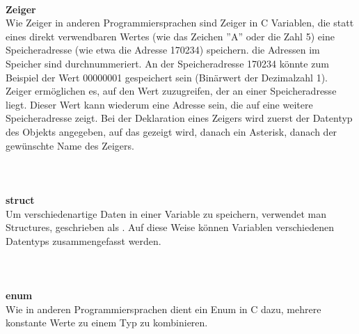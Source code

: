 \ \\
\textbf{Zeiger}\\
Wie Zeiger in anderen Programmiersprachen sind Zeiger in C Variablen, die statt eines direkt verwendbaren Wertes (wie das Zeichen ''A'' oder die Zahl 5) eine Speicheradresse (wie etwa die Adresse 170234) speichern. die Adressen im Speicher sind durchnummeriert. An der Speicheradresse 170234 könnte zum Beispiel der Wert 00000001 gespeichert sein (Binärwert der Dezimalzahl 1). Zeiger ermöglichen es, auf den Wert zuzugreifen, der an einer Speicheradresse liegt. Dieser Wert kann wiederum eine Adresse sein, die auf eine weitere Speicheradresse zeigt. Bei der Deklaration eines Zeigers wird zuerst der Datentyp des Objekts angegeben, auf das gezeigt wird, danach ein Asterisk, danach der gewünschte Name des Zeigers.\\
\ \\
\\
\ \\
\textbf{struct}\\
Um verschiedenartige Daten in einer Variable zu speichern, verwendet man Structures, geschrieben als . Auf diese Weise können Variablen verschiedenen Datentyps zusammengefasst werden.\\
\ \\
\\
\ \\
\textbf{enum}\\
Wie in anderen Programmiersprachen dient ein Enum in C dazu, mehrere konstante Werte zu einem Typ zu kombinieren.\\
\ \\
\\
